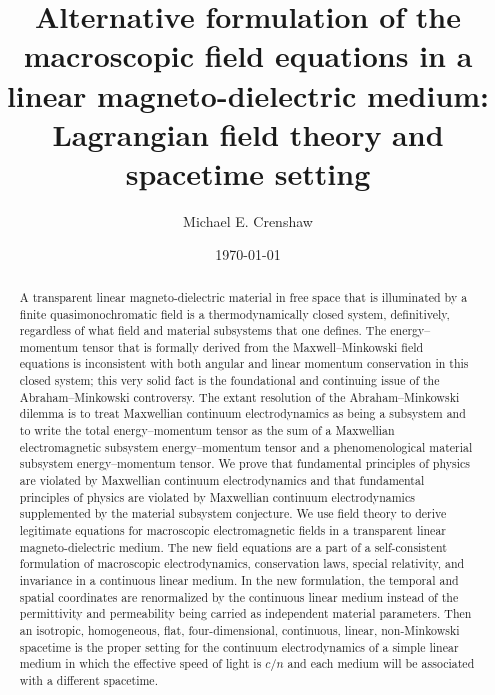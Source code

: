 \documentclass[twocolumn,amssymb,eqsecnum,aps,pra]{revtex4-2}
\begin{document}
\def \bbeta {{\beta}\hskip -5.6pt {\beta}}
\def \brho {{\rho} \hskip -4.5pt { \rho}}
\def \bnab {{\bf\nabla}\hskip-8.8pt{\bf\nabla}\hskip-9.1pt{\bf\nabla}}
\title{Alternative formulation of the macroscopic field equations in a linear magneto-dielectric medium: Lagrangian field theory and spacetime setting}
\author{Michael E. Crenshaw}
\begin{abstract}
\par
A transparent linear magneto-dielectric material in free space that is
illuminated by a finite quasimonochromatic field is a thermodynamically
closed system, definitively, regardless of what field and material
subsystems that one defines.
The energy--momentum tensor that is formally derived from the
Maxwell--Minkowski field equations is inconsistent with both angular
and linear momentum conservation in this closed system; this very
solid fact is the foundational and continuing issue of the
Abraham--Minkowski controversy.
The extant resolution of the Abraham--Minkowski dilemma is to treat
Maxwellian continuum electrodynamics as being a subsystem and to
write the total energy--momentum tensor as the sum of a Maxwellian
electromagnetic subsystem energy--momentum tensor and a
phenomenological material subsystem energy--momentum tensor.
We prove that fundamental principles of physics are violated by
Maxwellian continuum electrodynamics and that fundamental principles
of physics are violated by Maxwellian continuum electrodynamics
supplemented by the material subsystem conjecture.
We use field theory to derive legitimate equations for macroscopic
electromagnetic fields in a transparent linear magneto-dielectric
medium.
The new field equations are a part of a self-consistent formulation
of macroscopic electrodynamics, conservation laws, special
relativity, and invariance in a continuous linear medium.
In the new formulation, the temporal and spatial coordinates are
renormalized by the continuous linear medium instead of the
permittivity and permeability being carried as independent
material parameters. Then an isotropic, homogeneous, flat,
four-dimensional, continuous, linear, non-Minkowski spacetime
is the proper setting for the continuum electrodynamics of a
simple linear medium in which the effective speed of light is
$c/n$ and each medium will be associated with a different
spacetime.
\end{abstract}
\date{\today}
\maketitle
\par
\end{document}
